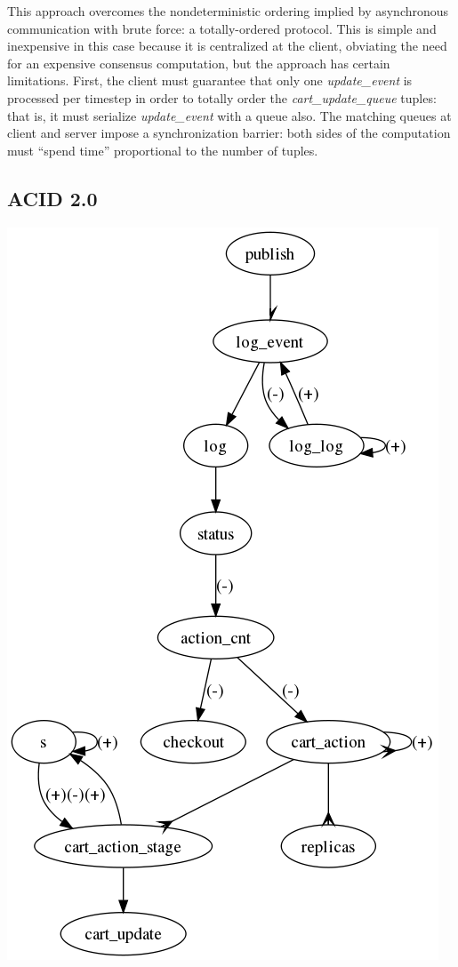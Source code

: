 This approach overcomes the nondeterministic ordering implied by asynchronous
communication with brute force: a totally-ordered protocol. This is simple and
inexpensive in this case because it is centralized at the client, obviating the
need for an expensive consensus computation, but the approach has certain
limitations.  First, the client must guarantee that only one {\em
update\_event} is processed per timestep in order to totally order the {\em
cart\_update\_queue} tuples: that is, it must serialize {\em update\_event}
with a queue also.  The matching queues at client and server impose a
synchronization barrier: both sides of the computation must ``spend time''
proportional to the number of tuples.

\subsection{ACID 2.0}

\includegraphics[width=0.75\linewidth]{vizza_brick.png}

